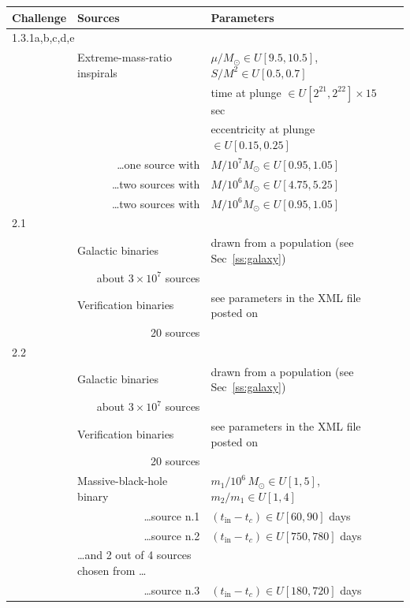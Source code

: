 \documentclass[12pt]{iopart}
\begin{document}
\begin{table}
\begin{tabular}{llll}
\hline
Challenge & Sources & Parameters \\
\hline
\multicolumn{2}{l}{1.3.1a,b,c,d,e} & \\
&Extreme-mass-ratio inspirals & $\mu/M_\odot \in U[9.5,10.5]$, $S/M^2 \in U[0.5, 0.7]$ \\
&                                             & time at plunge $\in  U[2^{21},2^{22}] \times 15$ sec \\
&                                             & eccentricity at plunge $\in U[0.15, 0.25]$ \\
&\multicolumn{1}{r}{\ldots one source with}          & $M / 10^7 M_\odot \in U[0.95,1.05]$ \\
&\multicolumn{1}{r}{\ldots two sources with}         & $M / 10^6 M_\odot \in U[4.75,5.25]$ \\
&\multicolumn{1}{r}{\ldots two sources with}         & $M / 10^6 M_\odot \in U[0.95,1.05]$ \\
\hline
2.1 & & \\
&Galactic binaries & drawn from a population (see Sec~\ref{ss:galaxy})\\
&\multicolumn{1}{r}{about $3\times 10^7$ sources} & \\
&Verification binaries & see parameters in the XML file posted on~\cite{MLDCweb}\\
&\multicolumn{1}{r}{20 sources} \\
\hline
2.2 & & \\
&Galactic binaries & drawn from a population (see Sec~\ref{ss:galaxy})\\
&\multicolumn{1}{r}{about $3\times 10^7$ sources} \\
&Verification binaries & see parameters in the XML file posted on~\cite{MLDCweb} \\
&\multicolumn{1}{r}{20 sources} & \\
&Massive-black-hole binary & $m_1/10^6\,M_\odot \in U[1,5]$, $m_2/m_1 \in U[1,4]$ \\
&\multicolumn{1}{r}{\ldots source n.1} &  $(t_\mathrm{in} - t_c) \in U[60,90]$ days \\
&\multicolumn{1}{r}{\ldots source n.2} &  $(t_\mathrm{in} - t_c) \in U[750,780]$ days \\
&\ldots and 2 out of 4 sources chosen from \ldots & \\
&\multicolumn{1}{r}{\ldots source n.3} & $(t_\mathrm{in} - t_c) \in U[180,720]$ days \\

\end{tabular}
\end{table}
\end{document}
